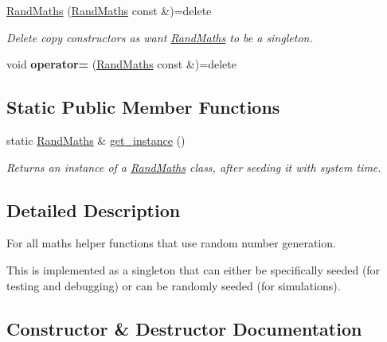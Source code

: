 \begin{DoxyCompactItemize}
\item 
\mbox{\hyperlink{classrcombinator_1_1RandMaths_ac9b350a4aa07b739dcc2bb12c3b5c0e5}{Rand\+Maths}} (\mbox{\hyperlink{classrcombinator_1_1RandMaths}{Rand\+Maths}} const \&)=delete
\begin{DoxyCompactList}\small\item\em Delete copy constructors as want \mbox{\hyperlink{classrcombinator_1_1RandMaths}{Rand\+Maths}} to be a singleton. \end{DoxyCompactList}\item 
\mbox{\label{classrcombinator_1_1RandMaths_ab26d84d79d640cd343ac3e94a70ad184}} 
void {\bfseries operator=} (\mbox{\hyperlink{classrcombinator_1_1RandMaths}{Rand\+Maths}} const \&)=delete
\end{DoxyCompactItemize}

\subsection*{Static Public Member Functions}
\begin{DoxyCompactItemize}
\item 
static \mbox{\hyperlink{classrcombinator_1_1RandMaths}{Rand\+Maths}} \& \mbox{\hyperlink{classrcombinator_1_1RandMaths_ae54dee1a16fb0e275e1624ccaa7dc87e}{get\+\_\+instance}} ()
\begin{DoxyCompactList}\small\item\em Returns an instance of a \mbox{\hyperlink{classrcombinator_1_1RandMaths}{Rand\+Maths}} class, after seeding it with system time. \end{DoxyCompactList}\end{DoxyCompactItemize}


\subsection{Detailed Description}
For all maths helper functions that use random number generation. 

This is implemented as a singleton that can either be specifically seeded (for testing and debugging) or can be randomly seeded (for simulations). 

\subsection{Constructor \& Destructor Documentation}
\mbox{\label{classrcombinator_1_1RandMaths_ac9b350a4aa07b739dcc2bb12c3b5c0e5}} 
